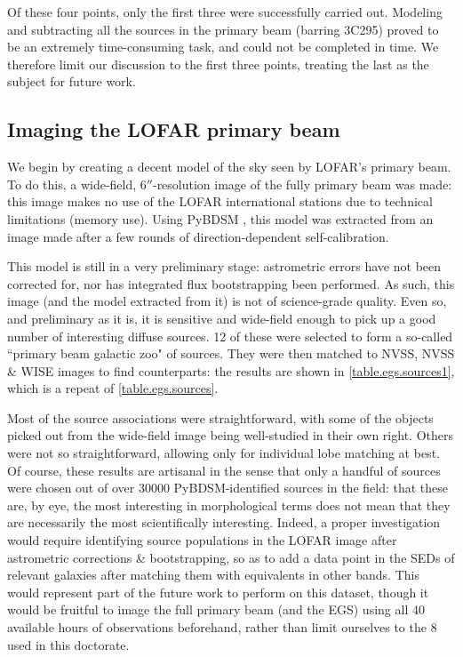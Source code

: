 \pg
Of these four points, only the first three were successfully carried out. Modeling and subtracting all the sources in the primary beam (barring 3C295) proved to be an extremely time-consuming task, and could not be completed in time. We therefore limit our discussion to the first three points, treating the last as the subject for future work.

\subsection{Imaging the LOFAR primary beam}

\pg
We begin by creating a decent model of the sky seen by LOFAR's primary beam. To do this, a wide-field, $6''$-resolution image of the fully primary beam was made: this image makes no use of the LOFAR international stations due to technical limitations (memory use). Using PyBDSM , this model was extracted from an image made after a few rounds of direction-dependent self-calibration.

\pg
This model is still in a very preliminary stage: astrometric errors have not been corrected for, nor has integrated flux bootstrapping been performed. As such, this image (and the model extracted from it) is not of science-grade quality. Even so, and preliminary as it is, it is sensitive and wide-field enough to pick up a good number of interesting diffuse sources. 12 of these were selected to form a so-called ``primary beam galactic zoo" of sources. They were then matched to NVSS, NVSS \& WISE images to find counterparts: the results are shown in \cref{table.egs.sources1}, which is a repeat of \cref{table.egs.sources}.

\pg
Most of the source associations were straightforward, with some of the objects picked out from the wide-field image being well-studied in their own right. Others were not so straightforward, allowing only for individual lobe matching at best. Of course, these results are artisanal in the sense that only a handful of sources were chosen out of over 30000 PyBDSM-identified sources in the field: that these are, by eye, the most interesting in morphological terms does not mean that they are necessarily the most scientifically interesting. Indeed, a proper investigation would require identifying source populations in the LOFAR image after astrometric corrections \& bootstrapping, so as to add a data point in the SEDs of relevant galaxies after matching them with equivalents in other bands. This would represent part of the future work to perform on this dataset, though it would be fruitful to image the full primary beam (and the EGS) using all 40 available hours of observations beforehand, rather than limit ourselves to the 8 used in this doctorate.

